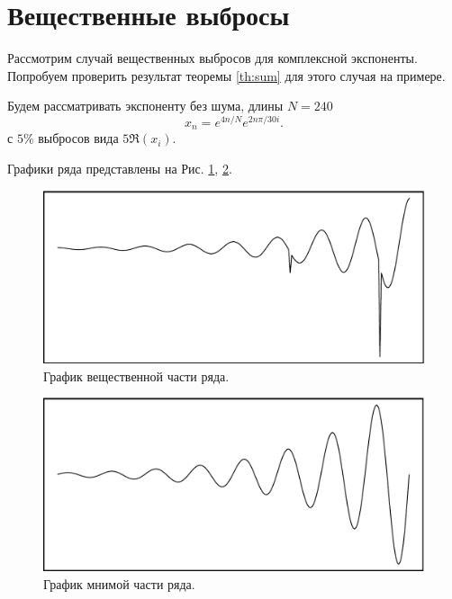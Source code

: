 \documentclass[specialist,
               substylefile = spbu.rtx,
               subf,href,colorlinks=true, 12pt]{disser}
\begin{document}
\section{Вещественные выбросы}

Рассмотрим случай вещественных выбросов для комплексной экспоненты. Попробуем проверить результат теоремы \ref{th:sum} для этого случая на примере.

Будем рассматривать экспоненту без шума, длины $N = 240$
$$x_n = e^{4n/N} e^{2n\pi/30i}.$$
с $5\%$ выбросов вида $5 \Re(x_i)$.

Графики ряда представлены на Рис. \ref{ser_Re_5}, \ref{ser_Im_5}.

\begin{figure}[H]
	\begin{center}
		\includegraphics[width=0.67\linewidth]{Re_outl_Re.png}
		\caption{График вещественной части ряда.}
		\label{ser_Re_5}
	\end{center}
\end{figure}

\begin{figure}[H]
	\begin{center}
		\includegraphics[width=0.67\linewidth]{Re_outl_Im.png}
		\caption{График мнимой части ряда.}
		\label{ser_Im_5}
	\end{center}
\end{figure} 
\end{document}
